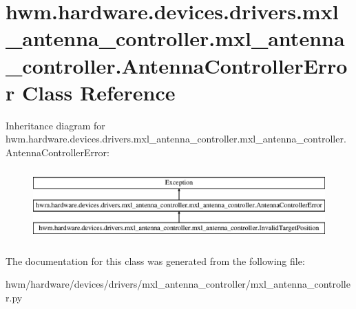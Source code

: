 \hypertarget{classhwm_1_1hardware_1_1devices_1_1drivers_1_1mxl__antenna__controller_1_1mxl__antenna__controller_1_1_antenna_controller_error}{\section{hwm.\-hardware.\-devices.\-drivers.\-mxl\-\_\-antenna\-\_\-controller.\-mxl\-\_\-antenna\-\_\-controller.\-Antenna\-Controller\-Error Class Reference}
\label{classhwm_1_1hardware_1_1devices_1_1drivers_1_1mxl__antenna__controller_1_1mxl__antenna__controller_1_1_antenna_controller_error}
}
Inheritance diagram for hwm.\-hardware.\-devices.\-drivers.\-mxl\-\_\-antenna\-\_\-controller.\-mxl\-\_\-antenna\-\_\-controller.\-Antenna\-Controller\-Error\-:\begin{figure}[H]
\begin{center}
\leavevmode
\includegraphics[height=2.790698cm]{classhwm_1_1hardware_1_1devices_1_1drivers_1_1mxl__antenna__controller_1_1mxl__antenna__controller_1_1_antenna_controller_error}
\end{center}
\end{figure}


The documentation for this class was generated from the following file\-:\begin{DoxyCompactItemize}
\item 
hwm/hardware/devices/drivers/mxl\-\_\-antenna\-\_\-controller/mxl\-\_\-antenna\-\_\-controller.\-py\end{DoxyCompactItemize}
